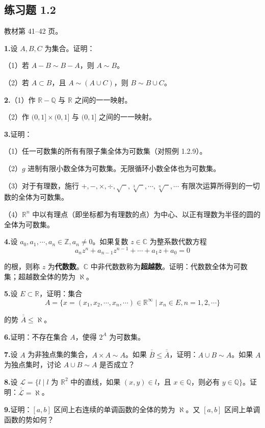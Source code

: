 \documentclass[11pt,a4paper]{article}
\begin{document}
\subsection*{练习题 1.2}
\noindent 教材第 41--42 页。
\par{}\noindent\textbf{1.}\quad 设 $A,B,C$ 为集合。证明：
\par\noindent （1）若 $A-B\sim B-A$，则 $A\sim B$。
\par\noindent （2）若 $A\subset B$，且 $A\sim(A\cup C)$，则 $B\sim B\cup C$。
\par{}\noindent\textbf{2.}\quad （1）作 $\mathbb R-\mathbb Q$ 与 $\mathbb R$ 之间的一一映射。
\par\noindent （2）作 $(0,1]\times(0,1]$ 与 $(0,1]$ 之间的一一映射。
\par{}\noindent\textbf{3.}\quad 证明：
\par\noindent （1）任一可数集的所有有限子集全体为可数集（对照例 1.2.9）。
\par\noindent （2）$g$ 进制有限小数全体为可数集。无限循环小数全体也为可数集。
\par\noindent （3）对于有理数，施行 $+,-,\times,\div,\sqrt{\phantom{x}},\sqrt[3]{\phantom{x}},\cdots,\sqrt[n]{\phantom{x}},\cdots$ 有限次运算所得到的一切数的全体为可数集。
\par\noindent （4）$\mathbb R^n$ 中以有理点（即坐标都为有理数的点）为中心、以正有理数为半径的圆的全体为可数集。
\par{}\noindent\textbf{4.}\quad 设 $a_0,a_1,\cdots,a_n\in\mathbb Z,a_n\ne0$。如果复数 $z\in\mathbb C$ 为整系数代数方程
\[a_nz^n+a_{n-1}z^{n-1}+\cdots+a_1z+a_0=0\]
\par\noindent 的根，则称 $z$ 为\textbf{代数数}。$\mathbb C$ 中非代数数称为\textbf{超越数}。证明：代数数全体为可数集；超越数全体的势为 $\aleph$。
\par{}\noindent\textbf{5.}\quad 设 $E\subset\mathbb R$，证明：集合
\[A=\{x=(x_1,x_2,\cdots,x_n,\cdots)\in\mathbb R^\infty\mid x_n\in E,n=1,2,\cdots\}\]
\par\noindent 的势 $\overline{\overline A}\leq\aleph$。
\par{}\noindent\textbf{6.}\quad 证明：不存在集合 $A$，使得 $2^A$ 为可数集。
\par{}\noindent\textbf{7.}\quad 设 $A$ 为非独点集的集合，$A\times A\sim A$。如果 $\overline{\overline B}\leq\overline{\overline A}$，证明：$A\cup B\sim A$。如果 $A$ 为独点集时，讨论 $A\cup B\sim A$ 是否成立？
\par{}\noindent\textbf{8.}\quad 设 $\mathcal L=\{l\mid l$ 为 $\mathbb R^2$ 中的直线，如果 $(x,y)\in l$，且 $x\in\mathbb Q$，则必有 $y\in\mathbb Q\}$。证明：$\overline{\overline{\mathcal L}}=\aleph$。
\par{}\noindent\textbf{9.}\quad 证明：$[a,b]$ 区间上右连续的单调函数的全体的势为 $\aleph$。又 $[a,b]$ 区间上单调函数的势如何？
\end{document}
